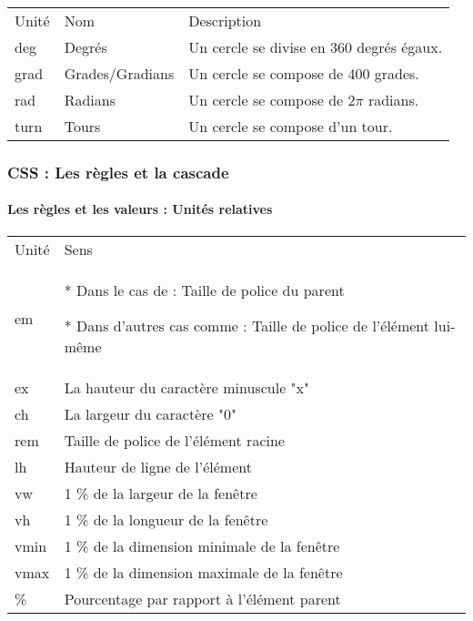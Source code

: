 \documentclass[xcolor=table]{beamer}
\begin{document}
\begin{frame}[fragile]
\begin{center}
	\begin{tabular}{lll}
		\rowcolor{darkblue}
		\color{white}Unité & \color{white}Nom & \color{white}Description \\
		deg & Degrés & Un cercle se divise en 360 degrés égaux. \\
		grad & Grades/Gradians & Un cercle se compose de 400 grades. \\
		rad & Radians & Un cercle se compose de $2\pi$ radians. \\
		turn & Tours & Un cercle se compose d'un tour. \\
	\end{tabular}
\end{center}

\end{frame}

\begin{frame}[fragile]
\frametitle{CSS : Les règles et la cascade}
\framesubtitle{Les règles et les valeurs : Unités relatives}

\scriptsize\bfseries
{}

\begin{center}
	\begin{tabular}{p{}p{}}
		\rowcolor{darkblue}
		\color{white}Unité & \color{white}Sens\\
		em & * Dans le cas de \keyword{font-size} : Taille de police du parent 
		
		* Dans d'autres cas comme \keyword{width} : Taille de police  de l'élément lui-même\\
		ex & La hauteur du caractère minuscule "x"\\
		ch & La largeur du caractère "0"\\
		rem & Taille de police de l'élément racine\\
		lh & Hauteur de ligne de l'élément\\
		vw & 1 \% de la largeur de la fenêtre\\
		vh & 1 \% de la longueur de la fenêtre\\
		vmin & 1 \% de la dimension minimale de la fenêtre\\
		vmax & 1 \% de la dimension maximale de la fenêtre\\
		\% & Pourcentage par rapport à l'élément parent\\
	\end{tabular}
\end{center}

\end{frame}
\end{document}
